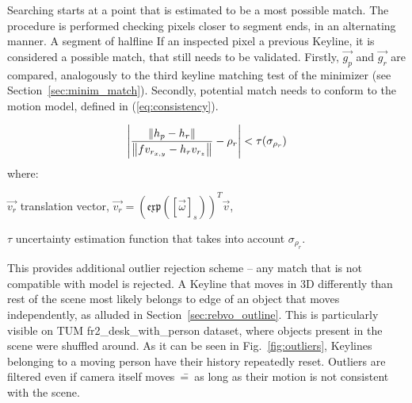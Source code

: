 Searching starts at a point that is estimated to be a most possible match. The procedure is performed checking pixels closer to segment ends, in an alternating manner. A segment of halfline If an inspected pixel a previous Keyline, it is considered a possible match, that still needs to be validated. Firstly, $\vec{g_p}$ and $\vec{g_r}$ are compared, analogously to the third keyline matching test of the minimizer (see Section~\ref{sec:minim_match}). Secondly, potential match needs to conform to the motion model, defined in (\ref{eq:consistency}).

\begin{equation}
\abs* {\frac{\norm*{h_p - h_r}}{\norm*{fv_{r_{x,y}}-h_{r}v_{r_z}} }-\rho_{r}} < \tau(\sigma_{\rho_{r}})
\label{eq:consistency}
\end{equation}
where:
\begin{eqwhere}[2cm]
	\item[$\vec{v_r}$] translation vector, $\vec{v_r} = \left( \mathfrak{exp} \left ( \left[ \vec{\omega} \right ]_{s} \right ) \right) ^T \vec{v}$,
	\item[$\tau$] uncertainty estimation function that takes into account $\sigma_{\rho_{r}}$.
\end{eqwhere}

This provides additional outlier rejection scheme -- any match that is not compatible with model is rejected. A Keyline that moves in 3D differently than rest of the scene most likely belongs to edge of an object that moves independently, as alluded in Section~\ref{sec:rebvo_outline}. This is particularly visible on TUM fr2\_desk\_with\_person dataset, where objects present in the scene were shuffled around. As it can be seen in Fig.~\ref{fig:outliers}, Keylines belonging to a moving person have their history repeatedly reset. Outliers are filtered even if camera itself moves~\==~as long as their motion is not consistent with the scene.

